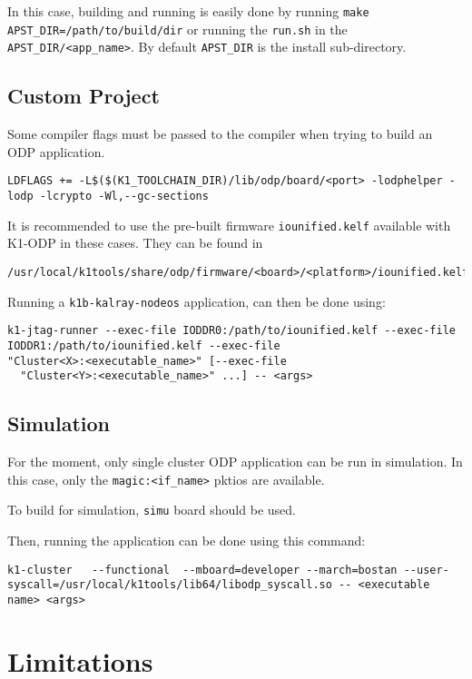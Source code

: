 \documentclass{trkalray}
\begin{document}
In this case, building and running is easily done by running
\texttt{make APST\_DIR=/path/to/build/dir} or running the
\texttt{run.sh} in the \texttt{APST\_DIR/<app\_name>}.
By default \texttt{APST\_DIR} is the install sub-directory.


\subsection{Custom Project}

Some compiler flags must be passed to the compiler when trying to
build an ODP application.
\begin{lstlisting}
LDFLAGS += -L$($(K1_TOOLCHAIN_DIR)/lib/odp/board/<port> -lodphelper -lodp -lcrypto -Wl,--gc-sections
\end{lstlisting}

It is recommended to use the pre-built firmware
\texttt{iounified.kelf} available with K1-ODP in these cases.
They can be found in
\begin{lstlisting}
/usr/local/k1tools/share/odp/firmware/<board>/<platform>/iounified.kelf
\end{lstlisting}

Running a \texttt{k1b-kalray-nodeos} application, can then be done using:
\begin{lstlisting}
k1-jtag-runner --exec-file IODDR0:/path/to/iounified.kelf --exec-file
IODDR1:/path/to/iounified.kelf --exec-file
"Cluster<X>:<executable_name>" [--exec-file
  "Cluster<Y>:<executable_name>" ...] -- <args>
\end{lstlisting}

\subsection{Simulation}

For the moment, only single cluster ODP application can be run in
simulation. In this case, only the \texttt{magic:<if\_name>} pktios
are available.

To build for simulation, \texttt{simu} board should be used.

Then, running the application can be done using this command:
\begin{lstlisting}
k1-cluster   --functional  --mboard=developer --march=bostan --user-syscall=/usr/local/k1tools/lib64/libodp_syscall.so -- <executable name> <args>
\end{lstlisting}

\section{Limitations}
\end{document}
